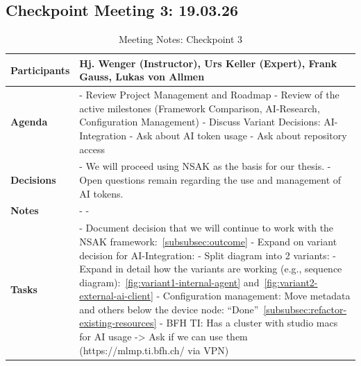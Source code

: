 \subsection{Checkpoint Meeting 3: 19.03.26}\label{subsec:checkpoint-meeting-3}

\begin{table}[H]
	\centering
	\begin{tabular}{p{2.5cm} | p{10cm}}

		\textbf{Participants} &
		Hj. Wenger (Instructor), Urs Keller (Expert), Frank Gauss, Lukas von Allmen\\[6pt]
		\hline

		\textbf{Agenda} &
		- Review Project Management and Roadmap
		- Review of the active milestones (Framework Comparison, \gls{AI}-Research, Configuration Management)\newline
		- Discuss Variant Decisions: \gls{AI}-Integration \newline
		- Ask about \gls{AI} token usage \newline
		- Ask about repository access \\[6pt]
		\hline

		\textbf{Decisions} &
		- We will proceed using \gls{NSAK} as the basis for our thesis. \newline
		- Open questions remain regarding the use and management of \gls{AI} tokens. \\[10pt]
		\hline

		\textbf{Notes} &
		- \newline
		- \\
		\hline

		\textbf{Tasks} &
		- Document decision that we will continue to work with the \gls{NSAK} framework:~\ref{subsubsec:outcome}
		- Expand on variant decision for \gls{AI}-Integration:
			- Split diagram into 2 variants:
			- Expand in detail how the variants are working (e.g., sequence diagram):~\ref{fig:variant1-internal-agent} and~\ref{fig:variant2-external-ai-client}
		- Configuration management: Move metadata and others below the device node: \enquote{Done}~\ref{subsubsec:refactor-existing-resources}
		- BFH TI: Has a cluster with studio macs for \gls{AI} usage -> Ask if we can use them (https://mlmp.ti.bfh.ch/ via VPN)

	\end{tabular}
	\caption{Meeting Notes: Checkpoint 3}
	\label{tab:meeting-notes-checkpoint-3}
\end{table}
